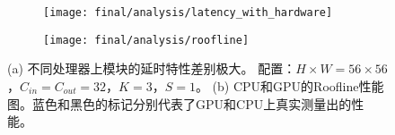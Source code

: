 \begin{figure}[htbp]
    \centering
    \begin{subfigure}[b]{0.96\linewidth}
        \centering
        \texttt{[image: final/analysis/latency\_with\_hardware]}
    	\caption{\label{fig:latency_with_hardware}}
    \end{subfigure}
    \begin{subfigure}[b]{0.96\linewidth}
        \centering
        \texttt{[image: final/analysis/roofline]}
        \caption{\label{fig:roofline}}
    \end{subfigure}
    \caption{
        (a) 不同处理器上模块的延时特性差别极大。
        配置：$H\times W=56 \times 56$，$C_{in}=C_{out}=32$，$K=3$，$S=1$。
        (b) CPU和GPU的Roofline性能图。蓝色和黑色的标记分别代表了GPU和CPU上真实测量出的性能。
    }
\end{figure}